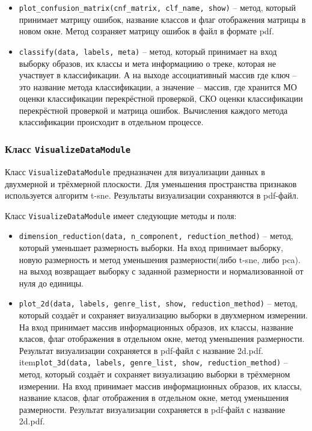 \begin{itemize}
\item{\texttt{plot\_confusion\_matrix(cnf_matrix, clf_name, show)} -- метод, который принимает матрицу ошибок, название классов и флаг отображения матрицы в новом окне.
Метод созраняет матрицу ошибок в файл в формате pdf. }
\item{\texttt{classify(data, labels, meta)} -- метод, который принимает на вход выборку образов, их классы и мета информациию о треке, которая не участвует в классификации. А на выходе ассоциативный массив где ключ -- это название метода классификации, а значение -- массив, где хранится МО оценки классификации перекрёстной проверкой, СКО оценки классификации перекрёстной проверкой и матрица ошибок. Вычисления каждого метода классификации происходит в отдельном процессе.}
\end{itemize}

\subsubsection{Класс \texttt{VisualizeDataModule}}

Класс \texttt{VisualizeDataModule} предназначен для визуализации данных в двухмерной и трёхмерной плоскости. Для уменьшения пространства признаков используется алгоритм t-sne. Результаты визуализации сохраняются в pdf-файл. 

Класс \texttt{VisualizeDataModule} имеет следующие методы и поля:

\begin{itemize}
\item{\texttt{dimension\_reduction(data, n\_component, reduction\_method)} -- метод, который уменьшает размерность выборки. На вход принимает выборку, новую размерность и метод уменьшения размерности(либо t-sne, либо pca). на выход возвращает выборку с заданной размерности и нормализованной от нуля до единицы.}
\item{\texttt{plot\_2d(data, labels, genre\_list, show, reduction\_method)} -- метод, который создаёт и сохраняет визуализацию выборки в двухмерном измерении. На вход принимает массив информационных образов, их классы, название класов, флаг отображения в отдельном окне, метод уменьшения размерности. Результат визуализации сохраняется в pdf-файл с название 2d.pdf.}
item{\texttt{plot\_3d(data, labels, genre\_list, show, reduction\_method)} -- метод, который создаёт и сохраняет визуализацию выборки в трёхмерном измерении. На вход принимает массив информационных образов, их классы, название класов, флаг отображения в отдельном окне, метод уменьшения размерности. Результат визуализации сохраняется в pdf-файл с название 2d.pdf.}
\end{itemize}


